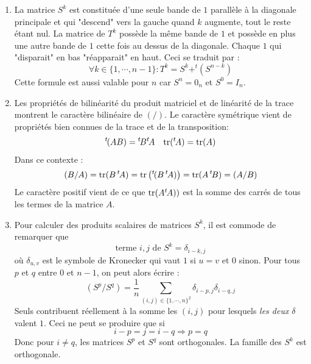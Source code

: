 \begin{enumerate}
\item La matrice $S^k$ est constituée d'une seule bande de $1$ parallèle à la diagonale principale et qui "descend" vers la gauche quand $k$ augmente, tout le reste étant nul. La matrice de $T^k$ possède la même bande de $1$ et possède en plus une autre bande de $1$ cette fois au dessus de la diagonale. Chaque $1$ qui "disparait" en bas "réapparait" en haut. Ceci se traduit par :
\begin{displaymath}
 \forall k \in\{1,\cdots,n-1\} : T^k = S^k + ^{t\!}(S^{n-k})
\end{displaymath}
Cette formule est aussi valable pour $n$ car $S^n=0_n$ et $S^0=I_n$.

\item Les propriétés de bilinéarité du produit matriciel et de linéarité de la trace montrent le caractère bilinéaire de $( / )$.\newline
Le caractère symétrique vient de propriétés bien connues de la trace et de la transposition:
\begin{align*}
 \mathstrut^{t\!}(AB)= \mathstrut^{t\!}B \mathstrut^{t\!}A & & \operatorname{tr}(\mathstrut^{t\!}A)=\operatorname{tr}( A)
\end{align*}
Dans ce contexte :
\begin{displaymath}
 (B/A)=\operatorname{tr}(B\, \mathstrut^{t\!}A)=\operatorname{tr}\left( \mathstrut^{t\!}(B\, \mathstrut^{t\!}A)\right)
= \operatorname{tr}(A\, \mathstrut^{t\!}B)=(A/B)
\end{displaymath}
Le caractère positif vient de ce que $\operatorname{tr}(A \mathstrut^{t\!}A))$ est la somme des carrés de tous les termes de la matrice $A$.
\item Pour calculer des produits scalaires de matrices $S^k$, il est commode de remarquer que 
\begin{displaymath}
 \text{terme $i,j$ de $S^k$} = \delta_{i-k,j}
\end{displaymath}
où $\delta_{u,v}$ est le symbole de Kronecker qui vaut $1$ si $u=v$ et $0$ sinon. Pour tous $p$ et $q$ entre $0$ et $n-1$, on peut alors écrire :
\begin{displaymath}
 (S^p/S^q)=\frac{1}{n}\sum_{(i,j)\in\{1,\cdots,n\}^2}\delta_{i-p,j}\delta_{i-q,j}
\end{displaymath}
Seuls contribuent réellement à la somme les $(i,j)$ pour lesquels \emph{les deux} $\delta$ valent $1$. Ceci ne peut se produire que si
\begin{displaymath}
 i-p=j=i-q \Rightarrow p=q
\end{displaymath}
Donc pour $i\neq q$, les matrices $S^p$ et $S^q$ sont orthogonales. La famille des $S^k$ est orthogonale.\newline

\end{enumerate}
